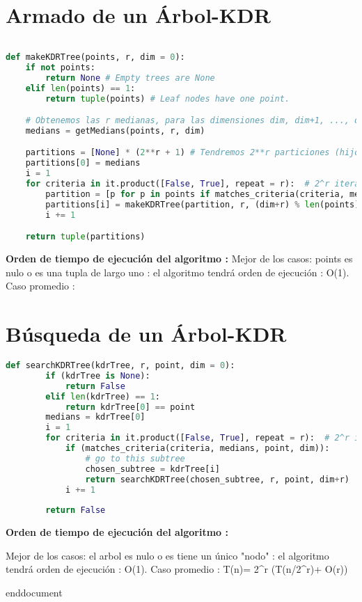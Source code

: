 
\section{Armado de un Árbol-KDR}
\begin{lstlisting}[language=Python]
	
def makeKDRTree(points, r, dim = 0):
	if not points:
		return None # Empty trees are None
	elif len(points) == 1:
		return tuple(points) # Leaf nodes have one point.

	# Obtenemos las r medianas, para las dimensiones dim, dim+1, ..., dim+(r-1)
	medians = getMedians(points, r, dim)

	partitions = [None] * (2**r + 1) # Tendremos 2**r particiones (hijos)
	partitions[0] = medians
	i = 1
	for criteria in it.product([False, True], repeat = r):  # 2^r iteraciones
		partition = [p for p in points if matches_criteria(criteria, medians, p, dim)] # n iteraciones
		partitions[i] = makeKDRTree(partition, r, (dim+r) % len(points))
		i += 1

	return tuple(partitions)
	\end{lstlisting}
\textbf{ Orden de tiempo de ejecución del algoritmo : }
{Mejor de los casos: points es nulo o es una tupla de largo uno : 
el algoritmo tendrá orden de ejecución : O(1).
Caso promedio : 
}


	\section{Búsqueda de un Árbol-KDR}
	\begin{lstlisting}[language=Python]
	def searchKDRTree(kdrTree, r, point, dim = 0):
		if (kdrTree is None):
			return False
		elif len(kdrTree) == 1:
			return kdrTree[0] == point
		medians = kdrTree[0]
		i = 1
		for criteria in it.product([False, True], repeat = r):  # 2^r iteraciones
			if (matches_criteria(criteria, medians, point, dim)):
				# go to this subtree
				chosen_subtree = kdrTree[i]
				return searchKDRTree(chosen_subtree, r, point, dim+r)
			i += 1
	
		return False
		\end{lstlisting}
	\textbf{ Orden de tiempo de ejecución del algoritmo : }
		{Mejor de los casos: el arbol es nulo o es tiene un único "nodo" : 
		el algoritmo tendrá orden de ejecución : O(1).
		Caso promedio : T(n)= 2^r (T(n/2^r)+ O(r))
		
		
		
		}
end{document}


